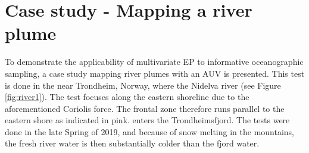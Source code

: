 \documentclass[aoas]{imsart}
\begin{document}
\begin{table}[!h]
    \centering
    \caption{Simulation results for the final mean explained variance ($\bR^{2}=100*(1-(\bSigma_{posterior}/\bSigma_{initial}))$) for 20 replicates, 8 configurations, and 6 strategies.}
    \label{tab:sim_res_r2}
\end{table}

\newpage

\section{Case study - Mapping a river plume}\label{sec:case_study}

To demonstrate the applicability of multivariate EP to informative oceanographic sampling, a case study mapping river plumes with an AUV is presented.
This test is done in the near Trondheim, Norway, where the Nidelva river (see Figure \ref{fig:river1}). The test focuses along the eastern shoreline due to the aforementioned Coriolis force.%
The frontal zone therefore runs parallel to the eastern shore as indicated in pink.  enters the Trondheimsfjord. The tests were done in the late Spring of 2019, and because of snow melting in the mountains, the fresh river water is then substantially colder than the fjord water.
\end{document}
